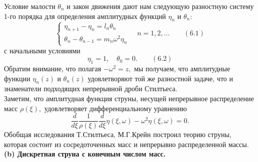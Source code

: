 \documentclass[12pt,a4paper]{article}
\theoremstyle{plain}   \newtheorem{Pro}{Задача}
\begin{document}
Условие малости
$ \theta _n $
и закон движения дают нам следующую разностную систему
1-го порядка для определения амплитудных функций
$ \eta _n $
и
$ \theta _n : $
\begin{equation*}
  \begin{cases}
    \eta _{n+1}-\eta _n =l_n \theta _n \\
	\theta _n -\theta _{n-1}=m_n \omega ^2 \eta _n
  \end{cases}
  \quad n=1,2,... \qquad (6.1)
\end{equation*}
с начальными условиями
$$
  \eta _1 =1, \quad \theta _0 =0 .
    \qquad (6.2)
$$
Обратим внимание, что полагая
$ -\omega ^2 =z, $
мы получаем, что амплитудные функции
$ \eta _n (z) $
и
$ \theta _n (z) $
удовлетворяют той же разностной задаче, что и знаменатели
подходящих непрерывной дроби Стилтьеса. \\
Заметим, что амплитудная функция струны, несущей
непрерывное распределение масс
$ \rho (\xi ) , $
удовлетворяет дифференциальному уравнению
$$
  \frac{d}{d\xi}\frac{1}{\rho (\xi )}
    \frac{d}{d\xi} \eta (\xi ,\omega )-
	  \omega ^2 \eta (\xi , \omega )=0.
$$
Обобщая исследования Т.Стилтьеса,
М.Г.Крейн построил теорию струны, которая состоит из
сосредоточенных масс и непрерывно распределенной массы.
$$ \; $$
{\bfseries (b) Дискретная струна с конечным числом масс.} \\
\end{document}
